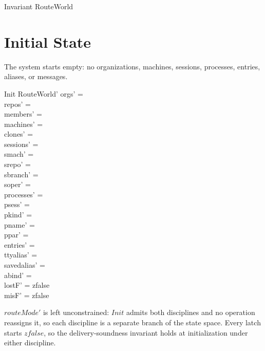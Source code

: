 \documentclass[a4paper,10pt,fleqn]{article}
\begin{document}
\begin{schema}{Invariant}
  RouteWorld
\end{schema}

\section{Initial State}

The system starts empty: no organizations, machines, sessions,
processes, entries, aliases, or messages.

\begin{schema}{Init}
  RouteWorld'
  \where
  orgs' = \emptyset \\
  repos' = \emptyset \\
  members' = \emptyset \\
  machines' = \emptyset \\
  clones' = \emptyset \\
  sessions' = \emptyset \\
  smach' = \emptyset \\
  srepo' = \emptyset \\
  sbranch' = \emptyset \\
  soper' = \emptyset \\
  processes' = \emptyset \\
  psess' = \emptyset \\
  pkind' = \emptyset \\
  pname' = \emptyset \\
  ppar' = \emptyset \\
  entries' = \emptyset \\
  ttyalias' = \emptyset \\
  savedalias' = \emptyset \\
  abind' = \emptyset \\
  lostF' = zfalse \\
  misF' = zfalse
\end{schema}

$routeMode'$ is left unconstrained: $Init$ admits both disciplines and no
operation reassigns it, so each discipline is a separate branch of the
state space.  Every latch starts $zfalse$, so the delivery-soundness
invariant holds at initialization under either discipline.
\end{document}
